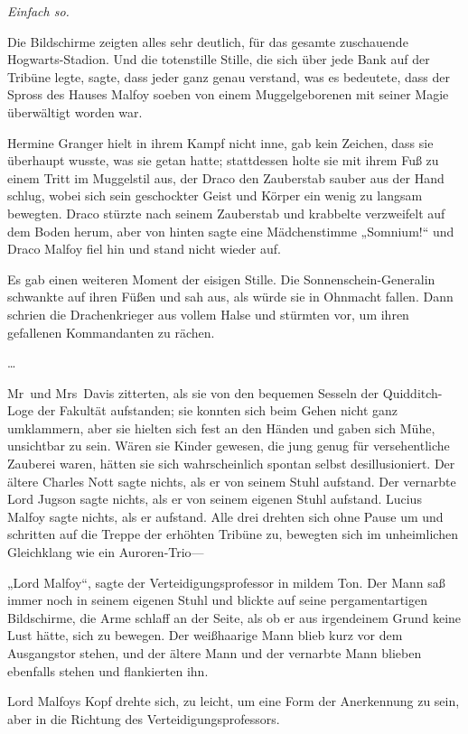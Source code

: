 {\emph{Einfach so.}

Die Bildschirme zeigten alles sehr deutlich, für das gesamte zuschauende Hogwarts-Stadion. Und die totenstille Stille, die sich über jede Bank auf der Tribüne legte, sagte, dass jeder ganz genau verstand, was es bedeutete, dass der Spross des Hauses Malfoy soeben von einem Muggelgeborenen mit seiner Magie überwältigt worden war.

Hermine Granger hielt in ihrem Kampf nicht inne, gab kein Zeichen, dass sie überhaupt wusste, was sie getan hatte; stattdessen holte sie mit ihrem Fuß zu einem Tritt im Muggelstil aus, der Draco den Zauberstab sauber aus der Hand schlug, wobei sich sein geschockter Geist und Körper ein wenig zu langsam bewegten. Draco stürzte nach seinem Zauberstab und krabbelte verzweifelt auf dem Boden herum, aber von hinten sagte eine Mädchenstimme „Somnium!“ und Draco Malfoy fiel hin und stand nicht wieder auf.

Es gab einen weiteren Moment der eisigen Stille. Die Sonnenschein-Generalin schwankte auf ihren Füßen und sah aus, als würde sie in Ohnmacht fallen. Dann schrien die Drachenkrieger aus vollem Halse und stürmten vor, um ihren gefallenen Kommandanten zu rächen.

…

Mr~und Mrs~Davis zitterten, als sie von den bequemen Sesseln der Quidditch-Loge der Fakultät aufstanden; sie konnten sich beim Gehen nicht ganz umklammern, aber sie hielten sich fest an den Händen und gaben sich Mühe, unsichtbar zu sein. Wären sie Kinder gewesen, die jung genug für versehentliche Zauberei waren, hätten sie sich wahrscheinlich spontan selbst desillusioniert. Der ältere Charles Nott sagte nichts, als er von seinem Stuhl aufstand. Der vernarbte Lord Jugson sagte nichts, als er von seinem eigenen Stuhl aufstand. Lucius Malfoy sagte nichts, als er aufstand. Alle drei drehten sich ohne Pause um und schritten auf die Treppe der erhöhten Tribüne zu, bewegten sich im unheimlichen Gleichklang wie ein Auroren-Trio—

„Lord Malfoy“, sagte der Verteidigungsprofessor in mildem Ton. Der Mann saß immer noch in seinem eigenen Stuhl und blickte auf seine pergamentartigen Bildschirme, die Arme schlaff an der Seite, als ob er aus irgendeinem Grund keine Lust hätte, sich zu bewegen. Der weißhaarige Mann blieb kurz vor dem Ausgangstor stehen, und der ältere Mann und der vernarbte Mann blieben ebenfalls stehen und flankierten ihn.

Lord Malfoys Kopf drehte sich, zu leicht, um eine Form der Anerkennung zu sein, aber in die Richtung des Verteidigungsprofessors.

}
